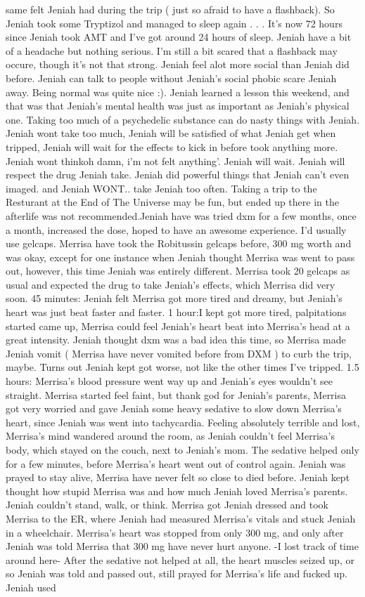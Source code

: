 \documentclass[12pt]{book}
\begin{document}
same felt Jeniah had during the trip ( just so afraid to have a flashback). So Jeniah took some Tryptizol and managed to sleep again . . .  It's now 72 hours since Jeniah took AMT and I've got around 24 hours of sleep. Jeniah have a bit of a headache but nothing serious. I'm still a bit scared that a flashback may occure, though it's not that strong. Jeniah feel alot more social than Jeniah did before. Jeniah can talk to people without Jeniah's social phobic scare Jeniah away. Being normal was quite nice :). Jeniah learned a lesson this weekend, and that was that Jeniah's mental health was just as important as Jeniah's physical one. Taking too much of a psychedelic substance can do nasty things with Jeniah. Jeniah wont take too much, Jeniah will be satisfied of what Jeniah get when tripped, Jeniah will wait for the effects to kick in before took anything more. Jeniah wont thinkoh damn, i'm not felt anything'. Jeniah will wait. Jeniah will respect the drug Jeniah take. Jeniah did powerful things that Jeniah can't even imaged. and Jeniah WONT.. take Jeniah too often. Taking a trip to the Resturant at the End of The Universe may be fun, but ended up there in the afterlife was not recommended.Jeniah have was tried dxm for a few months, once a month, increased the dose, hoped to have an awesome experience. I'd usually use gelcaps. Merrisa have took the Robitussin gelcaps before, 300 mg worth and was okay, except for one instance when Jeniah thought Merrisa was went to pass out, however, this time Jeniah was entirely different. Merrisa took 20 gelcaps as usual and expected the drug to take Jeniah's effects, which Merrisa did very soon. 45 minutes: Jeniah felt Merrisa got more tired and dreamy, but Jeniah's heart was just beat faster and faster. 1 hour:I kept got more tired, palpitations started came up, Merrisa could feel Jeniah's heart beat into Merrisa's head at a great intensity. Jeniah thought dxm was a bad idea this time, so Merrisa made Jeniah vomit ( Merrisa have never vomited before from DXM ) to curb the trip, maybe. Turns out Jeniah kept got worse, not like the other times I've tripped. 1.5 hours: Merrisa's blood pressure went way up and Jeniah's eyes wouldn't see straight. Merrisa started feel faint, but thank god for Jeniah's parents, Merrisa got very worried and gave Jeniah some heavy sedative to slow down Merrisa's heart, since Jeniah was went into tachycardia. Feeling absolutely terrible and lost, Merrisa's mind wandered around the room, as Jeniah couldn't feel Merrisa's body, which stayed on the couch, next to Jeniah's mom. The sedative helped only for a few minutes, before Merrisa's heart went out of control again. Jeniah was prayed to stay alive, Merrisa have never felt so close to died before. Jeniah kept thought how stupid Merrisa was and how much Jeniah loved Merrisa's parents. Jeniah couldn't stand, walk, or think. Merrisa got Jeniah dressed and took Merrisa to the ER, where Jeniah had measured Merrisa's vitals and stuck Jeniah in a wheelchair. Merrisa's heart was stopped from only 300 mg, and only after Jeniah was told Merrisa that 300 mg have never hurt anyone. -I lost track of time around here- After the sedative not helped at all, the heart muscles seized up, or so Jeniah was told and passed out, still prayed for Merrisa's life and fucked up. Jeniah used 
\end{document}
